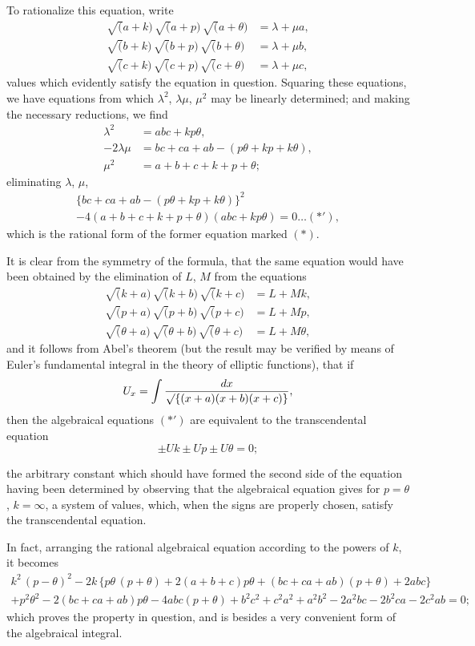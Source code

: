 \documentclass[11pt,a4paper]{book}
\begin{document}
To rationalize this equation, write
\begin{align*}
\surd(a+k)\,\surd(a+p)\,\surd(a+\theta) &= \lambda + \mu a,\\
\surd(b+k)\,\surd(b+p)\,\surd(b+\theta) &= \lambda + \mu b,\\
\surd(c+k)\,\surd(c+p)\,\surd(c+\theta) &= \lambda + \mu c,
\end{align*}
values which evidently satisfy the equation in question. Squaring these equations, we have equations from which $\lambda^2$, $\lambda\mu$, $\mu^2$ may be linearly determined; and making the necessary reductions, we find
\begin{align*}
\lambda^2 &= abc + kp\theta,\\
-2\lambda\mu &= bc+ca+ab-(p\theta+kp+k\theta),\\
\mu^2 &= a+b+c+k+p+\theta;
\end{align*}
eliminating $\lambda$, $\mu$,
\begin{multline*}
\{bc+ca+ab-(p\theta+kp+k\theta)\}^2\\
- 4(a+b+c+k+p+\theta)(abc+kp\theta) = 0\ldots(*'),
\end{multline*}
which is the rational form of the former equation marked $(*)$.

It is clear from the symmetry of the formula, that the same equation would have been obtained by the elimination of $L$, $M$ from the equations
\begin{align*}
\surd(k+a)\,\surd(k+b)\,\surd(k+c) &= L + Mk,\\
\surd(p+a)\,\surd(p+b)\,\surd(p+c) &= L + Mp,\\
\surd(\theta+a)\,\surd(\theta+b)\,\surd(\theta+c) &= L + M\theta,
\end{align*}
and it follows from Abel's theorem (but the result may be verified by means of Euler's fundamental integral in the theory of elliptic functions), that if
\[
U_x = \int \frac{dx}{\surd\{(x+a)(x+b)(x+c)\}},
\]
then the algebraical equations $(*')$ are equivalent to the transcendental equation
\[
\pm Uk \pm Up \pm U\theta = 0;
\]

\newpage
\setcounter{page}{55}

the arbitrary constant which should have formed the second side of the equation having been determined by observing that the algebraical equation gives for $p=\theta$, $k=\infty$, a system of values, which, when the signs are properly chosen, satisfy the transcendental equation.

In fact, arranging the rational algebraical equation according to the powers of $k$, it becomes
\begin{multline*}
k^2\,(p-\theta)^2 - 2k\,\{p\theta\,(p+\theta) + 2(a+b+c)p\theta + (bc+ca+ab)(p+\theta) + 2abc\}\\
+ p^2\theta^2 - 2(bc+ca+ab)p\theta - 4abc(p+\theta) + b^2c^2 + c^2a^2 + a^2b^2 - 2a^2bc - 2b^2ca - 2c^2ab = 0;
\end{multline*}
which proves the property in question, and is besides a very convenient form of the algebraical integral.
\end{document}
